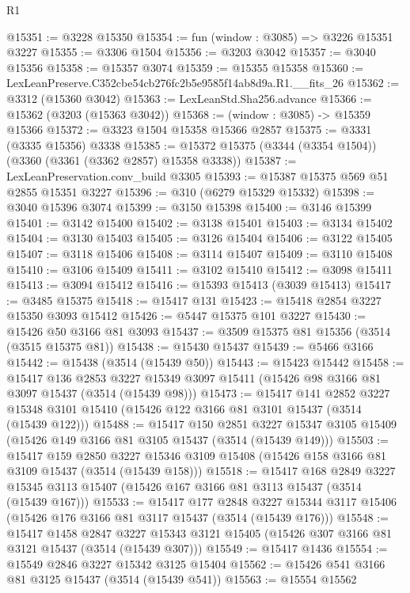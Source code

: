 \begin{lexlean}{R1}
\begin{coremodule}
@15351 := @3228 @15350
@15354 := fun (window : @3085) => @3226 @15351 @3227
@15355 := @3306 @1504
@15356 := @3203 @3042
@15357 := @3040 @15356
@15358 := @15357 @3074
@15359 := @15355 @15358
@15360 := LexLeanPreserve.C352cbe54cb276fc2b5e9585f14ab8d9a.R1.__fits_26
@15362 := @3312 (@15360 @3042)
@15363 := LexLeanStd.Sha256.advance
@15366 := @15362 (@3203 (@15363 @3042))
@15368 := (window : @3085) -> @15359 @15366
@15372 := @3323 @1504 @15358 @15366 @2857
@15375 := @3331 (@3335 @15356) @3338
@15385 := @15372 @15375 (@3344 (@3354 @1504)) (@3360 (@3361 (@3362 @2857) @15358 @3338))
@15387 := LexLeanPreservation.conv_build @3305
@15393 := @15387 @15375 @569 @51 @2855 @15351 @3227
@15396 := @310 (@6279 @15329 @15332)
@15398 := @3040 @15396 @3074
@15399 := @3150 @15398
@15400 := @3146 @15399
@15401 := @3142 @15400
@15402 := @3138 @15401
@15403 := @3134 @15402
@15404 := @3130 @15403
@15405 := @3126 @15404
@15406 := @3122 @15405
@15407 := @3118 @15406
@15408 := @3114 @15407
@15409 := @3110 @15408
@15410 := @3106 @15409
@15411 := @3102 @15410
@15412 := @3098 @15411
@15413 := @3094 @15412
@15416 := @15393 @15413 (@3039 @15413)
@15417 := @3485 @15375
@15418 := @15417 @131
@15423 := @15418 @2854 @3227 @15350 @3093 @15412
@15426 := @5447 @15375 @101 @3227
@15430 := @15426 @50 @3166 @81 @3093
@15437 := @3509 @15375 @81 @15356 (@3514 (@3515 @15375 @81))
@15438 := @15430 @15437
@15439 := @5466 @3166
@15442 := @15438 (@3514 (@15439 @50))
@15443 := @15423 @15442
@15458 := @15417
    @136
    @2853
    @3227
    @15349
    @3097
    @15411
    (@15426 @98 @3166 @81 @3097 @15437 (@3514 (@15439 @98)))
@15473 := @15417
    @141
    @2852
    @3227
    @15348
    @3101
    @15410
    (@15426 @122 @3166 @81 @3101 @15437 (@3514 (@15439 @122)))
@15488 := @15417
    @150
    @2851
    @3227
    @15347
    @3105
    @15409
    (@15426 @149 @3166 @81 @3105 @15437 (@3514 (@15439 @149)))
@15503 := @15417
    @159
    @2850
    @3227
    @15346
    @3109
    @15408
    (@15426 @158 @3166 @81 @3109 @15437 (@3514 (@15439 @158)))
@15518 := @15417
    @168
    @2849
    @3227
    @15345
    @3113
    @15407
    (@15426 @167 @3166 @81 @3113 @15437 (@3514 (@15439 @167)))
@15533 := @15417
    @177
    @2848
    @3227
    @15344
    @3117
    @15406
    (@15426 @176 @3166 @81 @3117 @15437 (@3514 (@15439 @176)))
@15548 := @15417
    @1458
    @2847
    @3227
    @15343
    @3121
    @15405
    (@15426 @307 @3166 @81 @3121 @15437 (@3514 (@15439 @307)))
@15549 := @15417 @1436
@15554 := @15549 @2846 @3227 @15342 @3125 @15404
@15562 := @15426 @541 @3166 @81 @3125 @15437 (@3514 (@15439 @541))
@15563 := @15554 @15562

\end{coremodule}
\end{lexlean}
